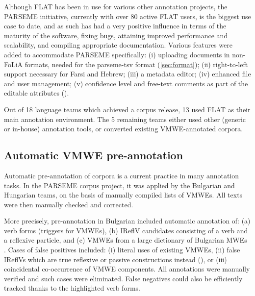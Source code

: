 \documentclass[output=paper,modfonts]{langscibook}
\begin{document}
Although FLAT has been in use for various other annotation projects, the PARSEME initiative, currently with over 80 active FLAT users, %
is the biggest use case to
date, and as such has had a very positive influence in terms of the maturity of the software, fixing bugs, attaining improved
performance and scalability, and compiling appropriate documentation. 
Various features were added to accommodate PARSEME specifically: (i) uploading documents in non-FoLiA formats, needed for the parseme-tsv format (\ref{sec:format}); (ii) right-to-left support necessary for Farsi and Hebrew; (iii) a metadata editor; (iv) enhanced file and user management; (v) confidence level and free-text comments as part of the editable attributes ().

Out of 18 language teams which achieved a corpus release, 13 used FLAT as their main annotation environment. The 5 remaining teams either used other (generic or in-house) annotation tools, or converted existing VMWE-annotated corpora. 

\subsection{Automatic VMWE pre-annotation}
\label{sec:pre-annot}
%
Automatic pre-annotation of corpora is a current practice in many annotation tasks. In the PARSEME corpus project, it was applied by the Bulgarian and Hungarian teams, on the basis of manually compiled lists of VMWEs. All texts were then manually checked and corrected.

More precisely, pre-annotation in Bulgarian included automatic annotation of: (a) verb forms (triggers for VMWEs), (b) IReflV candidates consisting of a verb and a reflexive particle, and (c) VMWEs from a large dictionary of Bulgarian MWEs \citep{Koeva2016}. Cases of false positives included: (i) literal uses of existing VMWEs, (ii) false IReflVs which are true reflexive or passive constructions instead (), or (iii) coincidental co-occurrence of VMWE components. All annotations were manually verified and such cases were eliminated. False negatives could also be efficiently tracked thanks to the highlighted verb forms.
\end{document}
